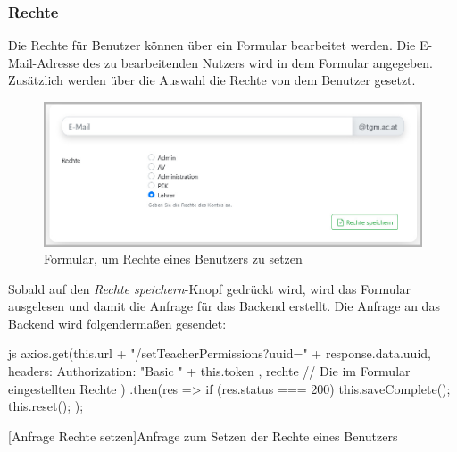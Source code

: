 \subsubsection{Rechte}
Die Rechte für Benutzer können über ein Formular bearbeitet werden. Die E-Mail-Adresse des zu bearbeitenden Nutzers wird in dem Formular angegeben. Zusätzlich werden über die Auswahl die Rechte von dem Benutzer gesetzt.
\begin{figure}[H]
	\centering
	\includegraphics[width=1\linewidth]{images/rfoster_implementierung/rights}
	\caption[Formular der Rechte]{Formular, um Rechte eines Benutzers zu setzen}
	\label{fig:rightsform}
\end{figure}
Sobald auf den \textit{Rechte speichern}-Knopf gedrückt wird, wird das Formular ausgelesen und damit die Anfrage für das Backend erstellt. Die Anfrage an das Backend wird folgendermaßen gesendet:
\begin{code}{js}
	axios.get(this.url + "/setTeacherPermissions?uuid=" + response.data.uuid,
	{
		headers: {
			Authorization: "Basic " + this.token
		}
	}, rechte	// Die im Formular eingestellten Rechte
	)
	.then(res => {
		if (res.status === 200) {
			this.saveComplete();
			this.reset();
		}
	});
\end{code}
[Anfrage Rechte setzen]{Anfrage zum Setzen der Rechte eines Benutzers}~\\